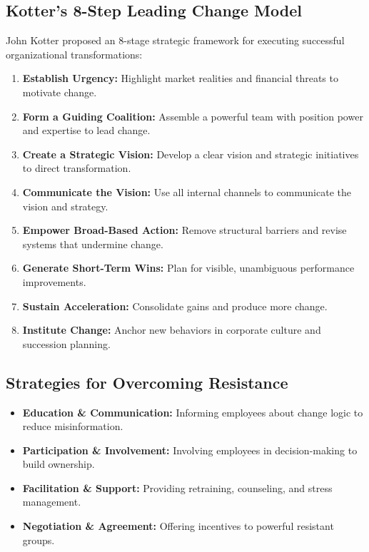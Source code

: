 \documentclass[12pt,a4paper]{article}
\begin{document}
\subsection{Kotter's 8-Step Leading Change Model}
John Kotter proposed an 8-stage strategic framework for executing successful organizational transformations:
\begin{enumerate}[leftmargin=*, itemsep=3pt]
  \item \textbf{Establish Urgency:} Highlight market realities and financial threats to motivate change.
  \item \textbf{Form a Guiding Coalition:} Assemble a powerful team with position power and expertise to lead change.
  \item \textbf{Create a Strategic Vision:} Develop a clear vision and strategic initiatives to direct transformation.
  \item \textbf{Communicate the Vision:} Use all internal channels to communicate the vision and strategy.
  \item \textbf{Empower Broad-Based Action:} Remove structural barriers and revise systems that undermine change.
  \item \textbf{Generate Short-Term Wins:} Plan for visible, unambiguous performance improvements.
  \item \textbf{Sustain Acceleration:} Consolidate gains and produce more change.
  \item \textbf{Institute Change:} Anchor new behaviors in corporate culture and succession planning.
\end{enumerate}

\subsection{Strategies for Overcoming Resistance}
\begin{itemize}[leftmargin=*, itemsep=3pt]
  \item \textbf{Education \& Communication:} Informing employees about change logic to reduce misinformation.
  \item \textbf{Participation \& Involvement:} Involving employees in decision-making to build ownership.
  \item \textbf{Facilitation \& Support:} Providing retraining, counseling, and stress management.
  \item \textbf{Negotiation \& Agreement:} Offering incentives to powerful resistant groups.
\end{itemize}
\end{document}
